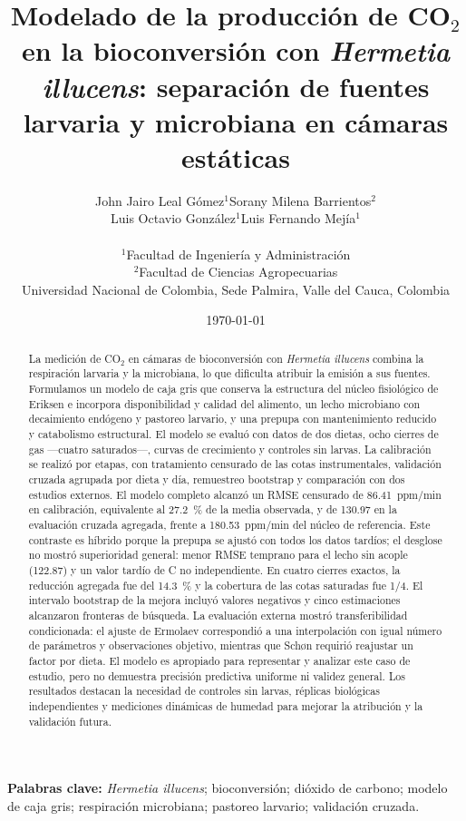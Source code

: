 \documentclass[11pt,a4paper]{article}
\title{Modelado de la producci\'on de CO$_2$ en la bioconversi\'on con
  \textit{Hermetia illucens}: separaci\'on de fuentes larvaria y
  microbiana en c\'amaras est\'aticas}
\author{%
\begin{tabular}{cc}
John Jairo Leal G\'omez${}^{1}$ & Sorany Milena Barrientos${}^{2}$\\[2pt]
Luis Octavio Gonz\'alez${}^{1}$ & Luis Fernando Mej\'ia${}^{1}$
\end{tabular}\\[8pt]
{\small ${}^{1}$Facultad de Ingenier\'ia y Administraci\'on}\\
{\small ${}^{2}$Facultad de Ciencias Agropecuarias}\\
{\small Universidad Nacional de Colombia, Sede Palmira, Valle del Cauca, Colombia}
}
\date{\today}
\begin{document}
\maketitle

\begin{abstract}
La medición de CO$_2$ en cámaras de bioconversión con \textit{Hermetia illucens} combina la respiración larvaria y la microbiana, lo que dificulta atribuir la emisión a sus fuentes. Formulamos un modelo de caja gris que conserva la estructura del núcleo fisiológico de Eriksen e incorpora disponibilidad y calidad del alimento, un lecho microbiano con decaimiento endógeno y pastoreo larvario, y una prepupa con mantenimiento reducido y catabolismo estructural. El modelo se evaluó con datos de dos dietas, ocho cierres de gas ---cuatro saturados---, curvas de crecimiento y controles sin larvas. La calibración se realizó por etapas, con tratamiento censurado de las cotas instrumentales, validación cruzada agrupada por dieta y día, remuestreo bootstrap y comparación con dos estudios externos. El modelo completo alcanzó un RMSE censurado de 86.41~ppm/min en calibración, equivalente al 27.2~\% de la media observada, y de 130.97 en la evaluación cruzada agregada, frente a 180.53~ppm/min del núcleo de referencia. Este contraste es híbrido porque la prepupa se ajustó con todos los datos tardíos; el desglose no mostró superioridad general: menor RMSE temprano para el lecho sin acople (122.87) y un valor tardío de C no independiente. En cuatro cierres exactos, la reducción agregada fue del 14.3~\% y la cobertura de las cotas saturadas fue 1/4. El intervalo bootstrap de la mejora incluyó valores negativos y cinco estimaciones alcanzaron fronteras de búsqueda. La evaluación externa mostró transferibilidad condicionada: el ajuste de Ermolaev correspondió a una interpolación con igual número de parámetros y observaciones objetivo, mientras que Schøn requirió reajustar un factor por dieta. El modelo es apropiado para representar y analizar este caso de estudio, pero no demuestra precisión predictiva uniforme ni validez general. Los resultados destacan la necesidad de controles sin larvas, réplicas biológicas independientes y mediciones dinámicas de humedad para mejorar la atribución y la validación futura.
\end{abstract}

\noindent\textbf{Palabras clave:} \textit{Hermetia illucens}; bioconversión; dióxido de carbono; modelo de caja gris; respiración microbiana; pastoreo larvario; validación cruzada.
\end{document}
